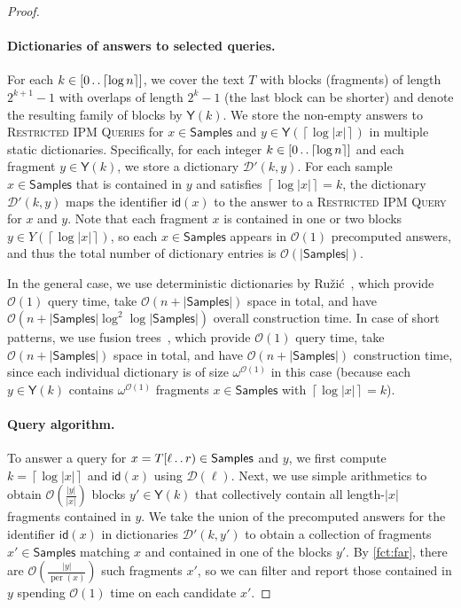 \documentclass[a4paper]{article}
\theoremstyle{definition}
\theoremstyle{remark}
\newcommand{\RIPM}{\textsc{Restricted IPM Queries}\xspace}
\newcommand{\RIPMOne}{\textsc{Restricted IPM Query}\xspace}
\newcommand{\R}{\mathsf{Samples}}
\newcommand{\Y}{\mathsf{Y}}
\newcommand{\ceil}[1]{\left\lceil #1 \right\rceil}
\newcommand{\dd}{\mathinner{\ldotp\ldotp}}
\DeclareMathOperator{\per}{per}
\newcommand{\Oh}{\mathcal{O}}
\newcommand{\id}{\mathsf{id}}
\begin{document}
\begin{proof}
\paragraph{Dictionaries of answers to selected queries.}
For each $k\in [0\dd \ceil{\log n}]$, we cover the text $T$ with blocks (fragments) of length $2^{k+1}-1$ with overlaps of length $2^k-1$ (the last block can be shorter)
and denote the resulting family of blocks by $\Y(k)$.
We store the non-empty answers to \RIPM for $x\in \R$ and $y\in \Y(\ceil{\log |x|})$ in multiple static dictionaries.
Specifically, for each integer $k\in [0\dd \ceil{\log n}]$ and each fragment $y\in \Y(k)$,
we store a dictionary $\mathcal{D}'(k,y)$.
For each sample $x \in \R$ that is contained in $y$ and satisfies $\ceil{\log |x|}=k$,
the dictionary $\mathcal{D}'(k,y)$ maps the identifier $\id(x)$ to the answer to a \RIPMOne for $x$ and $y$.
Note that each fragment $x$ is contained in one or two blocks $y\in Y(\ceil{\log |x|})$, 
so each $x\in \R$ appears in $\Oh(1)$ precomputed answers, and thus the total number of dictionary entries is $\Oh(|\R|)$.

In the general case, we use deterministic dictionaries by Ružić~\cite{DBLP:conf/icalp/Ruzic08},
which provide $\Oh(1)$ query time, take $\Oh(n+|\R|)$ space in total, and have $\Oh(n+|\R|\log^2 \log |\R|)$ 
overall construction time.
In case of short patterns, we use fusion trees~\cite{DBLP:conf/focs/PatrascuT14},
which provide $\Oh(1)$ query time, take $\Oh(n+|\R|)$ space in total, and have $\Oh(n + |\R|)$ construction time,
since each individual dictionary is of size $\omega^{\Oh(1)}$ in this case (because each $y\in \Y(k)$ contains $\omega^{\Oh(1)}$ fragments $x\in \R$ with $\ceil{\log |x|}=k$).

\paragraph{Query algorithm.}
To answer a query for $x=T[\ell \dd r) \in \R$ and $y$, we first compute $k=\ceil{\log |x|}$ and $\id(x)$ using $\mathcal{D}(\ell)$.
Next, we use simple arithmetics to obtain $\Oh(\frac{|y|}{|x|})$ blocks $y'\in \Y(k)$ 
that collectively contain all length-$|x|$ fragments contained in $y$.
We take the union of the precomputed answers for the identifier $\id(x)$ in dictionaries $\mathcal{D}'(k,y')$ to obtain a collection of fragments $x'\in \R$ matching $x$ and contained in one of the blocks $y'$.
By \cref{fct:far}, there are $\Oh(\frac{|y|}{\per(x)})$ such fragments $x'$, so we can filter and report those contained in $y$ spending $\Oh(1)$ time on each candidate $x'$.
\end{proof}
\end{document}
